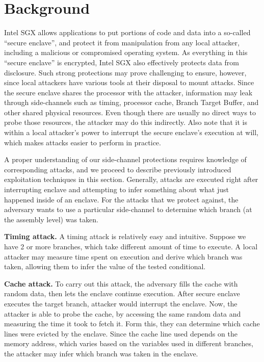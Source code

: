 \documentclass[sigplan, review]{acmart}
\begin{document}
\section{Background}
Intel SGX allows applications to put portions of code and data into a so-called “secure enclave”, and protect it from manipulation from any local attacker, including a malicious or compromised operating system. As everything in this “secure enclave” is encrypted, Intel SGX also effectively protects data from disclosure. Such strong protections may prove challenging to ensure, however, since local attackers have various tools at their disposal to mount attacks. Since the secure enclave shares the processor with the attacker, information may leak through side-channels such as timing, processor cache, Branch Target Buffer, and other shared physical resources. Even though there are usually no direct ways to probe those resources, the attacker may do this indirectly. Also note that it is within a local attacker’s power to interrupt the secure enclave’s execution at will, which makes attacks easier to perform in practice.

A proper understanding of our side-channel protections requires knowledge of corresponding attacks, and we proceed to describe previously introduced exploitation techniques in this section. Generally, attacks are executed right after interrupting enclave and attempting to infer something about what just happened inside of an enclave. For the attacks that we protect against, the adversary wants to use a particular side-channel to determine which branch (at the assembly level) was taken.

\textbf{Timing attack.}\cite{kocher1996timing} A timing attack is relatively easy and intuitive. Suppose we have 2 or more branches, which take different amount of time to execute. A local attacker may measure time spent on execution and derive which branch was taken, allowing them to infer the value of the tested conditional.

\textbf{Cache attack.}\cite{osvik2006cache} To carry out this attack, the adversary fills the cache with random data, then lets the enclave continue execution. After secure enclave executes the target branch, attacker would interrupt the enclave. Now, the attacker is able to probe the cache, by accessing the same random data and measuring the time it took to fetch it. Form this, they can determine which cache lines were evicted by the enclave. Since the cache line used depends on the memory address, which varies based on the variables used in different branches, the attacker may infer which branch was taken in the enclave.
\end{document}
